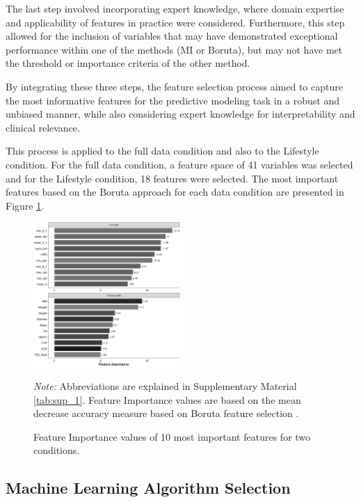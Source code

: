 The last step involved incorporating expert knowledge, where domain expertise and applicability of features in practice were considered. Furthermore, this step allowed for the inclusion of variables that may have demonstrated exceptional performance within one of the methods (MI or Boruta), but may not have met the threshold or importance criteria of the other method. 

By integrating these three steps, the feature selection process aimed to capture the most informative features for the predictive modeling task in a robust and unbiased manner, while also considering expert knowledge for interpretability and clinical relevance. 

This process is applied to the full data condition and also to the Lifestyle condition. For the full data condition, a feature space of 41 variables was selected and for the Lifestyle condition, 18 features were selected. The most important features based on the Boruta approach for each data condition are presented in Figure \ref{fig:features}.

\begin{figure}[tb]
\centering
\caption{Feature Importance values of 10 most important features for two conditions.}
\includegraphics[width=0.5\textwidth]{Figures/Feature_Imp_rs.png}
  \parbox{0.45\textwidth}{\small{\textit{Note:} Abbreviations are explained in Supplementary Material \ref{tab:sup_1}. Feature Importance values are based on the mean decrease accuracy measure based on Boruta feature selection .}}
\label{fig:features}
\end{figure} 

\subsection{Machine Learning Algorithm Selection}  \label{Machine Learning Algorithm Selection}

